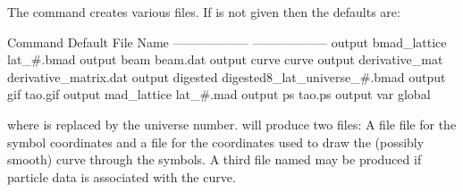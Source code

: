 \vskip 0.2in The  command creates various files. If  is
not given then the defaults are:
\begin{example}
  Command                         Default File Name
  ------------------              ------------------
  output bmad_lattice             lat_#.bmad
  output beam                     beam.dat
  output curve                    curve
  output derivative_mat           derivative_matrix.dat              
  output digested                 digested8_lat_universe_#.bmad
  output gif                      tao.gif
  output mad_lattice              lat_#.mad
  output ps                       tao.ps
  output var                      global%
\end{example}
where \vn{\#} is replaced by the universe number.  will produce two files: A file
 file for the symbol coordinates and a
 file for the coordinates used to draw the
(possibly smooth) curve through the symbols. A third file named
 may be produced if particle
data is associated with the curve.

